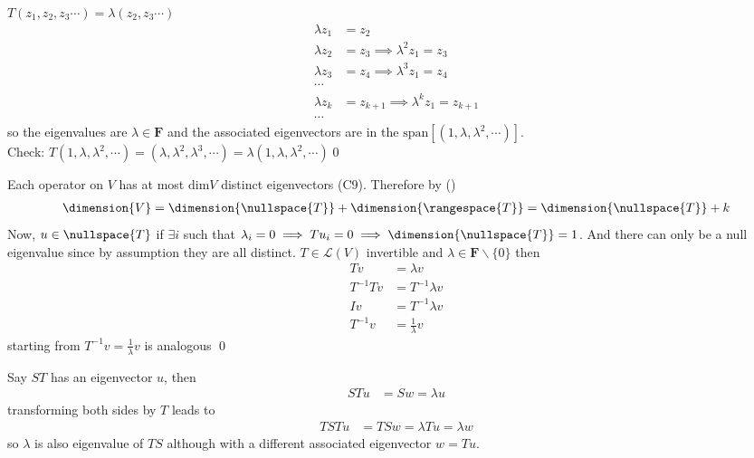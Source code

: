 \exo{}$T(z_1,z_2,z_3\cdots) = \lambda(z_2,z_3\cdots)$
\begin{align*}
\lambda z_1 &= z_2 \\
\lambda z_2 &= z_3 \implies \lambda^2z_1 = z_3\\
\lambda z_3 &= z_4 \implies \lambda^3z_1 = z_4\\
\cdots\\
\lambda z_k &= z_{k+1} \implies \lambda^kz_1 = z_{k+1}\\
\cdots
\end{align*}
so the eigenvalues are $\lambda\in\mathbf{F}$ and the associated eigenvectors are in the $\mathrm{span}\!\left[(1,\lambda, \lambda^2, \cdots)\right]$.\\Check: $T(1, \lambda, \lambda^2, \cdots) = (\lambda, \lambda^2,\lambda^3, \cdots) = \lambda (1,\lambda, \lambda^2, \cdots)$\qed

\exo{} Each operator on $V$ has at most $\mathrm{dim}V$ distinct eigenvectors (C9). Therefore by ()
\begin{align*}
\dimension{V} = \dimension{\nullspace{T}} +\dimension{\rangespace{T}} = \dimension{\nullspace{T}} + k
\end{align*}
Now, $u\in \nullspace{T}$ if $\exists i$ such that $\lambda_i=0 \implies Tu_i=0 \implies \dimension{\nullspace{T}}=1$. And there can only be a null eigenvalue since by assumption they are all distinct.
\exo{} $T \in\mathcal {L}(V)$ invertible and $\lambda\in\mathbf{F}\backslash\{0\}$ then
\begin{align*}
Tv&=\lambda v \\
T^{-1}Tv &= T^{-1}\lambda v\\
Iv &= T^{-1}\lambda v\\
T^{-1}v &= \frac{1}{\lambda}v
\end{align*}
starting from $T^{-1}v = \frac{1}{\lambda}v$ is analogous \qed

\exo{} Say $ST$ has an eigenvector $u$, then
\begin{align*}
STu &= Sw = \lambda u
\end{align*}
transforming both sides by $T$ leads to
\begin{align*}
TSTu &= TSw = \lambda Tu = \lambda w
\end{align*}
so $\lambda$ is also eigenvalue of $TS$ although with a different associated eigenvector $w = Tu$.

